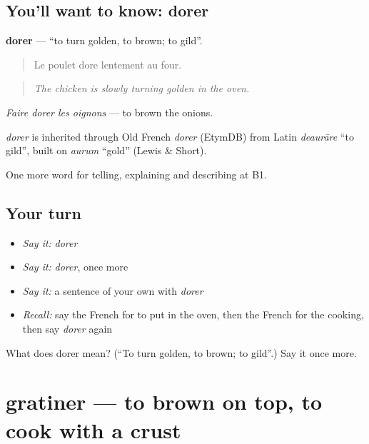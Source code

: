 \subsection*{You'll want to know: dorer}
\textbf{dorer} — \textquotedblleft{}to turn golden, to brown; to gild\textquotedblright{}.

\begin{quote}
Le poulet dore lentement au four.
\end{quote}

\begin{quote}
\emph{The chicken is slowly turning golden in the oven.}
\end{quote}

\emph{Faire dorer les oignons} — to brown the onions.

\begin{cousinweb}
\emph{dorer} is inherited through Old French \emph{dorer} (EtymDB) from Latin \emph{deaurāre} \textquotedblleft{}to gild\textquotedblright{}, built on \emph{aurum} \textquotedblleft{}gold\textquotedblright{} (Lewis \& Short).
\end{cousinweb}

\begin{grammarlens}[title={What you've built}]
One more word for telling, explaining and describing at B1.
\end{grammarlens}

\subsection*{Your turn}
\begin{itemize}
\raggedright
  \item \emph{Say it:} \emph{dorer}
  \item \emph{Say it:} \emph{dorer}, once more
  \item \emph{Say it:} a sentence of your own with \emph{dorer}
  \item \emph{Recall:} say the French for to put in the oven, then the French for the cooking, then say \emph{dorer} again
\end{itemize}

\begin{tcolorbox}[breakable,colback=teal!4,colframe=teal!35!black,title={Before you move on}]
What does dorer mean? (\textquotedblleft{}To turn golden, to brown; to gild\textquotedblright{}.) Say it once more.
\end{tcolorbox}
\section[gratiner]{gratiner — to brown on top, to cook with a crust}

